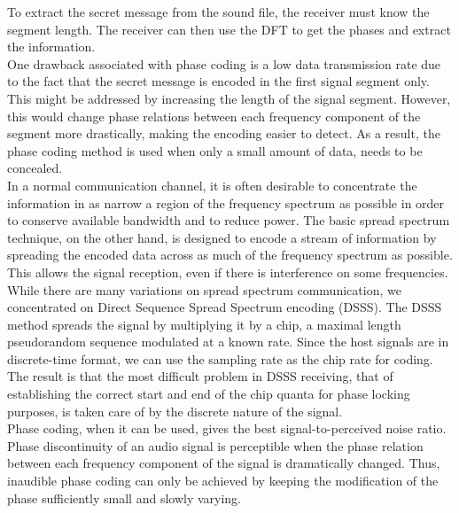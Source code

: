 \documentclass[a4paper, 12pt, notitlepage]{report}
\begin{document}
To  extract  the  secret  message  from  the  sound  file, the receiver must know the segment length. The receiver can then 
use the DFT to get the phases and extract the information.\\

One  drawback  associated  with  phase  coding  is  a  low data transmission rate due to the fact that the secret message is 
encoded  in  the  first  signal  segment  only.  This  might  be addressed  by  increasing  the  length  of  the  signal  segment. 
However,  this  would  change  phase  relations  between  each frequency component of the segment more drastically, making 
the  encoding  easier  to  detect.  As  a  result,  the  phase  coding method  is  used  when  only  a  small  amount  of  data, needs to be concealed.\\ 

In a normal communication channel, it is often desirable to concentrate  the  information  in  as  narrow  a  region  of  the 
frequency  spectrum  as  possible  in  order  to  conserve  available bandwidth  and  to  reduce  power.  The  basic  spread  spectrum 
technique, on the other hand, is designed to encode a stream of information  by  spreading  the  encoded  data  across  as  much  of 
the  frequency  spectrum  as  possible.  This  allows  the  signal reception,  even  if  there  is  interference  on  some  frequencies. While  there  are  many  variations  on  spread  spectrum communication,  we  concentrated  on  Direct  Sequence  Spread 
Spectrum  encoding  (DSSS).  The  DSSS  method  spreads  the signal  by  multiplying  it  by  a  chip,  a  maximal  length 
pseudorandom sequence modulated at a known rate. Since the host  signals  are  in  discrete-time  format,  we  can  use  the 
sampling rate as the chip rate for coding. The result is that the most  difficult  problem  in  DSSS  receiving,  that  of  establishing the  correct  start  and  end  of  the  chip  quanta  for  phase  locking purposes, is taken care of by the discrete nature of the signal.\\ 
 
Phase coding, when it can be used, gives the best signal-to-perceived noise ratio. 
Phase discontinuity of an audio signal is perceptible 
when the phase relation between each frequency 
component of the signal is dramatically changed. Thus, 
inaudible phase coding can only be achieved by keeping 
the modification of the phase sufficiently small and slowly 
varying.\\
\end{document}
